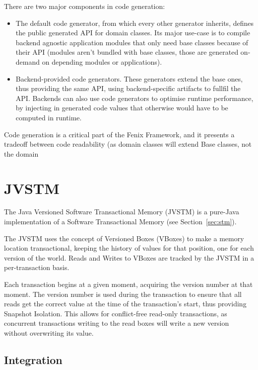 There are two major components in code generation:

\begin{itemize}

\item The default code generator, from which every other generator
  inherits, defines the public generated API for domain classes. Its
  major use-case is to compile backend agnostic application modules
  that only need base classes because of their API (modules aren't
  bundled with base classes, those are generated on-demand on
  depending modules or applications).

\item Backend-provided code generators. These generators extend the
  base ones, thus providing the same API, using backend-specific
  artifacts to fullfil the API. Backends can also use code generators
  to optimise runtime performance, by injecting in generated code
  values that otherwise would have to be computed in runtime.
\end{itemize}

Code generation is a critical part of the Fenix Framework, and it
presents a tradeoff between code readability (as domain classes will
extend Base classes, not the domain  

\section{JVSTM}
\label{sec:jvstm}

The Java Versioned Software Transactional Memory (JVSTM)
\cite{cachopo2006versioned} is a pure-Java implementation of a
Software Transactional Memory (see Section~\ref{sec:stm}).

The JVSTM uses the concept of Versioned Boxes (VBoxes) to make a
memory location transactional, keeping the history of values for that
position, one for each version of the world. Reads and Writes to
VBoxes are tracked by the JVSTM in a per-transaction basis. 

Each transaction begins at a given moment, acquiring the version
number at that moment. The version number is used during the
transaction to ensure that all reads get the correct value at the time
of the transaction's start, thus providing Snapshot Isolation. This
allows for conflict-free read-only transactions, as concurrent
transactions writing to the read boxes will write a new version
without overwriting its value.

\subsection{Integration}

